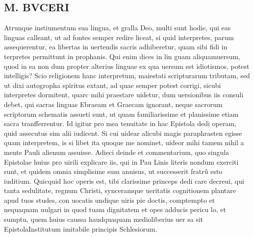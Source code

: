 \documentclass{article}
\begin{document}
\begin{pages}
\section*{M. BVCERI }\pstart Atrunque instiumentum sua lingua, et gralla Deo, multi sunt hodie, qui eas linguas calleant, ut ad fontes semper redire liceat, si quid interpretes, parum assequerentur, ea libertas in uertendis sacris adhiberetur, quam sibi fidi in terpretes permittunt in prophanis. Qui enim dices in lin guam aliquamuersum, quod in ea non dum propter alterius linguae ex qua uersum est idiotismos, potest intelligis? Scio religionem hanc interpretum, maiestati scripturarum tributam, sed ut dixi autogropha spiritus extant, ad quae semper potest corrigi, sicubi interpretes dormitent, quarc mihi praestare uidetur, dum uersionibus iis consuli debet, qui sacras linguas Ebraeam et Graecam ignorant, neque sacrorum scriptorum schematis assueti sunt, ut quam familiarissime et planissime etiam sacra tranfferrentur. Id igitur pro mea tenuitate in hac Epistola dedi operam, quid assecutus sim alii iudicent. Si cui uidear alicubi magis paraphrasten egisse quam interpretem, is si libet ita quoque me nominet, uideor mihi tamem nihil a mente Pauli alienum assuisse. Adieci deinde et commentarium, quo singula Epistolae huius pro uirili explicare iis, qui in Pau Linis literis nondum exerciti sunt, et quidem omnia simplisime sum annisus, ut successerit fratrũ esto iuditium.   \pend\pstart Quicquid hoc operis est, tibi clarissime princeps dedi care decreui, qui tanta sedulitate, regnum Christi, synceramque ueritatis cognitionem plantare apud tuos studes, con uocatis undique uiris pie doctis, comptempto et nequaquam uulgari in quod tuam dignitatem et opes adducis pericu lo, et sumptu, quem huius caussa haudquaquam medio\pendQuare liberius uer sa sit EpistolaInstitutum imitabile principis Schlesiorum.  

\end{pages}
\end{document}
